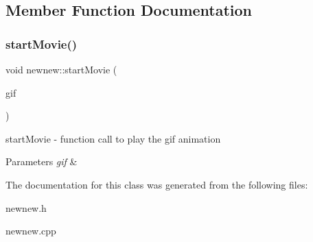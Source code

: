 \subsection{Member Function Documentation}
\mbox{\label{classnewnew_a03d2e950f73da3c67048a0f736b90c3f}} 
\subsubsection{\texorpdfstring{start\+Movie()}{startMovie()}}
{\footnotesize\ttfamily void newnew\+::start\+Movie (\begin{DoxyParamCaption}\item[{Q\+Movie \&}]{gif }\end{DoxyParamCaption})}



start\+Movie -\/ function call to play the gif animation 


\begin{DoxyParams}{Parameters}
{\em gif} & \\
\hline
\end{DoxyParams}


The documentation for this class was generated from the following files\+:\begin{DoxyCompactItemize}
\item 
newnew.\+h\item 
newnew.\+cpp\end{DoxyCompactItemize}
